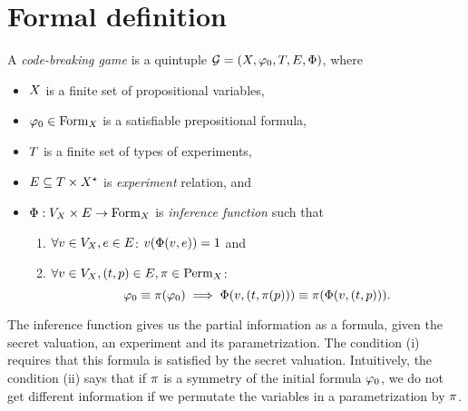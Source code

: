 \section{Formal definition}

\begin{definition} \label{def-game}
A \emph{code-breaking game} is a quintuple
  $\mathcal{G} = (X, \varphi_0, T, E, \Phi)$, where
  \begin{itemize}
  \item $X$ is a finite set of propositional variables,
  \item $\varphi_0 \in \textrm{Form}_X$ is a satisfiable prepositional formula,
  \item $T$ is a finite set of types of experiments,
  \item $E \subseteq T \times X^\star$ is \emph{experiment} relation,
  and
  \item $\Phi: V_X \times E -> \textrm{Form}_X$ is
  \emph{inference function} such that
    \begin{enumerate}[label=(\roman*)]
    \item $\forall v\in V_X, e\in E$:
      $v(\Phi(v, e)) = 1$ and
    \item $\forall v\in V_X, (t, p)\in E, \pi\in \textrm{Perm}_X$:
        \[
        \varphi_0 \equiv \pi(\varphi_0) \;==>\;
          \Phi(v, (t, \pi(p)))
          \equiv
          \pi(\Phi(v, (t, p))).
        \]
    \end{enumerate}
 \end{itemize}
\end{definition}

The inference function gives us the partial information as a formula,
  given the secret valuation, an experiment and its parametrization.
The condition (i) requires that this formula is satisfied
  by the secret valuation.
Intuitively, the condition (ii) says that if $\pi$ is a symmetry
  of the initial formula $\varphi_0$, we do not get different information
  if we permutate the variables in a parametrization by $\pi$.


